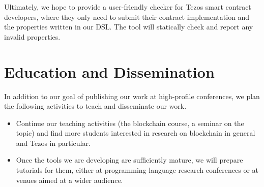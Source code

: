 \documentclass[a4paper,11pt]{article}
\begin{document}
Ultimately, we hope to provide a user-friendly checker for Tezos smart contract developers, where they only need to submit their contract implementation and the properties written in our DSL. The tool will statically check and report any invalid properties.
 
\section{Education and Dissemination}
\label{sec:education-dissemination}
In addition to our goal of publishing our work at high-profile conferences, we plan the following activities to teach and disseminate our work.
\begin{itemize}
\item Continue our teaching activities (the blockchain course, a seminar on the topic) and find more students interested in research on blockchain in general and Tezos in particular.
\item Once the tools we are developing are sufficiently mature, we will prepare tutorials for them, either at programming language research conferences or at venues aimed at a wider audience.
\end{itemize}




\end{document}

